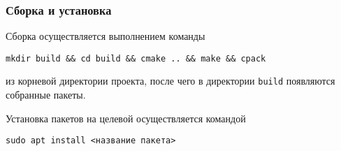 \subsubsection{Сборка и установка}

Сборка осуществляется выполнением команды

\noindent\lstinline|mkdir build && cd build && cmake .. && make && cpack|

\noindent из корневой директории проекта, после чего в директории \lstinline|build| появляются собранные пакеты.

Установка пакетов на целевой  осуществляется командой

\noindent\lstinline|sudo apt install <название пакета>|







 











